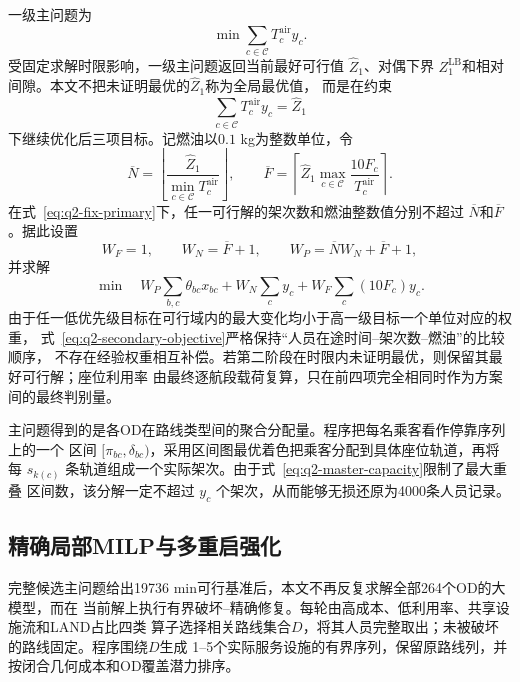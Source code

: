 \documentclass[UTF8,a4paper,zihao=5]{ctexart}
\begin{document}
一级主问题为
\begin{equation}
  \min\sum_{c\in\mathcal C}T_c^{\mathrm{air}}y_c.
  \label{eq:q2-master-primary}
\end{equation}
受固定求解时限影响，一级主问题返回当前最好可行值 $\widehat Z_1$、对偶下界
$Z_1^{\mathrm{LB}}$和相对间隙。本文不把未证明最优的$\widehat Z_1$称为全局最优值，
而是在约束
\begin{equation}
  \sum_{c\in\mathcal C}T_c^{\mathrm{air}}y_c=\widehat Z_1
  \label{eq:q2-fix-primary}
\end{equation}
下继续优化后三项目标。记燃油以$0.1$ kg为整数单位，令
\begin{equation}
  \overline N=\left\lfloor
  \frac{\widehat Z_1}{\min_{c\in\mathcal C}T_c^{\mathrm{air}}}
  \right\rfloor,
  \qquad
  \overline F=\left\lceil
  \widehat Z_1\max_{c\in\mathcal C}
  \frac{10F_c}{T_c^{\mathrm{air}}}
  \right\rceil .
  \label{eq:q2-secondary-bounds}
\end{equation}
在式~\eqref{eq:q2-fix-primary}下，任一可行解的架次数和燃油整数值分别不超过
$\overline N$和$\overline F$。据此设置
\begin{equation}
  W_F=1,\qquad
  W_N=\overline F+1,\qquad
  W_P=\overline N W_N+\overline F+1,
  \label{eq:q2-dominance-weights}
\end{equation}
并求解
\begin{equation}
  \min\quad
  W_P\sum_{b,c}\theta_{bc}x_{bc}
  +W_N\sum_cy_c
  +W_F\sum_c(10F_c)y_c.
  \label{eq:q2-secondary-objective}
\end{equation}
由于任一低优先级目标在可行域内的最大变化均小于高一级目标一个单位对应的权重，
式~\eqref{eq:q2-secondary-objective}严格保持“人员在途时间--架次数--燃油”的比较顺序，
不存在经验权重相互补偿。若第二阶段在时限内未证明最优，则保留其最好可行解；座位利用率
由最终逐航段载荷复算，只在前四项完全相同时作为方案间的最终判别量。

主问题得到的是各OD在路线类型间的聚合分配量。程序把每名乘客看作停靠序列上的一个
区间 $[\pi_{bc},\delta_{bc})$，采用区间图最优着色把乘客分配到具体座位轨道，再将每
$s_{k(c)}$ 条轨道组成一个实际架次。由于式~\eqref{eq:q2-master-capacity}限制了最大重叠
区间数，该分解一定不超过 $y_c$ 个架次，从而能够无损还原为4000条人员记录。

\subsection{精确局部MILP与多重启强化}

完整候选主问题给出19736 min可行基准后，本文不再反复求解全部264个OD的大模型，而在
当前解上执行有界破坏--精确修复。每轮由高成本、低利用率、共享设施流和LAND占比四类
算子选择相关路线集合$D$，将其人员完整取出；未被破坏的路线固定。程序围绕$D$生成
1--5个实际服务设施的有界序列，保留原路线列，并按闭合几何成本和OD覆盖潜力排序。
\end{document}
